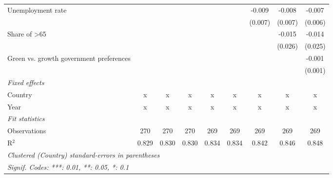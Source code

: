 \begin{table}[htbp]
\begin{tabular}{lcccccccc}
      Unemployment rate                                      &         &         &         &         &         & -0.009  & -0.008       & -0.007\\   
                                                             &         &         &         &         &         & (0.007) & (0.007)      & (0.006)\\   
      Share of >65                                           &         &         &         &         &         &         & -0.015       & -0.014\\   
                                                             &         &         &         &         &         &         & (0.026)      & (0.025)\\   
      Green vs. growth government preferences                &         &         &         &         &         &         &              & -0.001\\   
                                                             &         &         &         &         &         &         &              & (0.001)\\   
      \emph{Fixed effects}\\
      Country                                                & x       & x       & x       & x       & x       & x       & x            & x\\  
      Year                                                   & x       & x       & x       & x       & x       & x       & x            & x\\  
      \midrule \emph{Fit statistics}\\
      Observations                                           & 270     & 270     & 270     & 269     & 269     & 269     & 269          & 269\\  
      R$^2$                                                  & 0.829   & 0.830   & 0.830   & 0.834   & 0.834   & 0.842   & 0.846        & 0.848\\  
      \midrule
      \multicolumn{9}{l}{\emph{Clustered (Country) standard-errors in parentheses}}\\
      \multicolumn{9}{l}{\emph{Signif. Codes: ***: 0.01, **: 0.05, *: 0.1}}\\
   \end{tabular}
\end{table}


